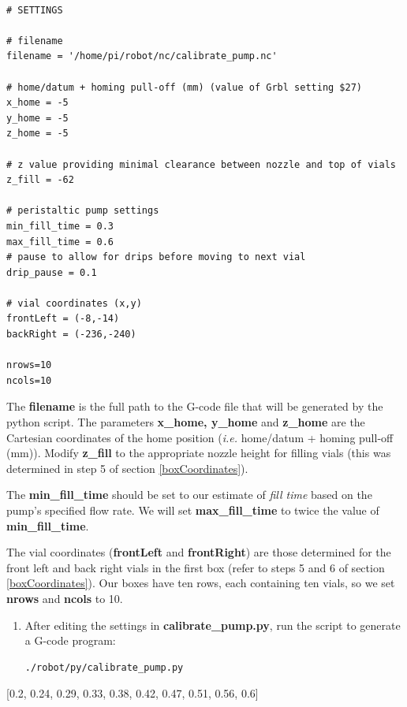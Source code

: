 \documentclass[]{book}
\theoremstyle{definition}
\theoremstyle{definition}
\theoremstyle{remark}
\begin{document}
\begin{verbatim}

# SETTINGS

# filename
filename = '/home/pi/robot/nc/calibrate_pump.nc'

# home/datum + homing pull-off (mm) (value of Grbl setting $27)
x_home = -5
y_home = -5
z_home = -5

# z value providing minimal clearance between nozzle and top of vials
z_fill = -62 

# peristaltic pump settings
min_fill_time = 0.3
max_fill_time = 0.6
# pause to allow for drips before moving to next vial
drip_pause = 0.1 

# vial coordinates (x,y)
frontLeft = (-8,-14)
backRight = (-236,-240)

nrows=10
ncols=10
\end{verbatim}

The \textbf{filename} is the full path to the G-code file that will be
generated by the python script. The parameters \textbf{x\_home, y\_home}
and \textbf{z\_home} are the Cartesian coordinates of the home position
(\emph{i.e.} home/datum + homing pull-off (mm)). Modify \textbf{z\_fill}
to the appropriate nozzle height for filling vials (this was determined
in step 5 of section \ref{boxCoordinates}).

The \textbf{min\_fill\_time} should be set to our estimate of \emph{fill
time} based on the pump's specified flow rate. We will set
\textbf{max\_fill\_time} to twice the value of \textbf{min\_fill\_time}.

The vial coordinates (\textbf{frontLeft} and \textbf{frontRight}) are
those determined for the front left and back right vials in the first
box (refer to steps 5 and 6 of section \ref{boxCoordinates}). Our boxes
have ten rows, each containing ten vials, so we set \textbf{nrows} and
\textbf{ncols} to 10.

\begin{enumerate}
\def\labelenumi{\arabic{enumi}.}
\setcounter{enumi}{2}
\item
  After editing the settings in \textbf{calibrate\_pump.py}, run the
  script to generate a G-code program:

\begin{verbatim}
./robot/py/calibrate_pump.py
\end{verbatim}
\end{enumerate}

{[}0.2, 0.24, 0.29, 0.33, 0.38, 0.42, 0.47, 0.51, 0.56, 0.6{]}
\end{document}
